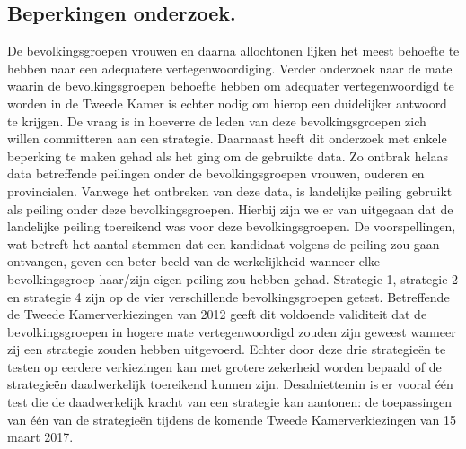 \subsection{Beperkingen onderzoek.}
De bevolkingsgroepen vrouwen en daarna allochtonen lijken het meest behoefte te hebben naar een adequatere vertegenwoordiging. Verder onderzoek naar de mate waarin de bevolkingsgroepen behoefte hebben om adequater vertegenwoordigd te worden in de Tweede Kamer is echter nodig om hierop een duidelijker antwoord te krijgen. De vraag is in hoeverre de leden van deze bevolkingsgroepen zich willen committeren aan een strategie. Daarnaast heeft dit onderzoek met enkele beperking te maken gehad als het ging om de gebruikte data. Zo ontbrak helaas data betreffende peilingen onder de bevolkingsgroepen vrouwen, ouderen en provincialen. Vanwege het ontbreken van deze data, is landelijke peiling gebruikt als peiling onder deze bevolkingsgroepen. Hierbij zijn we er van uitgegaan dat de landelijke peiling toereikend was voor deze bevolkingsgroepen. De voorspellingen, wat betreft het aantal stemmen dat een kandidaat volgens de peiling zou gaan ontvangen, geven een beter beeld van de werkelijkheid wanneer elke bevolkingsgroep haar/zijn eigen peiling zou hebben gehad. Strategie 1, strategie 2 en strategie 4 zijn op de vier verschillende bevolkingsgroepen getest. Betreffende de Tweede Kamerverkiezingen van 2012 geeft dit voldoende validiteit dat de bevolkingsgroepen in hogere mate vertegenwoordigd zouden zijn geweest wanneer zij een strategie zouden hebben uitgevoerd. Echter door deze drie strategie\"{e}n te testen op eerdere verkiezingen kan met grotere zekerheid worden bepaald of de strategie\"{e}n daadwerkelijk toereikend kunnen zijn. Desalniettemin is er vooral één test die de daadwerkelijk kracht van een strategie kan aantonen: de toepassingen van één van de strategie\"{e}n tijdens de komende Tweede Kamerverkiezingen van 15 maart 2017.


